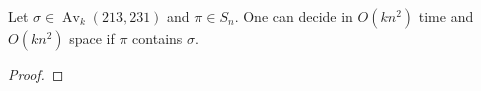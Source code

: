 \documentclass[a4paper]{llncs}
\DeclareMathOperator{\AV}{Av}
\newcommand{\ptext}{\pi}
\newcommand{\pmotif}{\sigma}
\DeclareMathOperator{\factora}{factor}
\newcommand{\factor}[2]{\factora_{{#1}}({#2})}
\DeclareMathOperator{\firsta}{first}
\newcommand{\first}[2]{\firsta(\factor{#1}{#2})}
\begin{document}
\begin{proposition}
	\label{Proposition:sigma avoids 213 and 231}
	Let $\sigma \in \AV_k(213,231)$ and $\pi \in S_n$.
	One can decide in $O(kn^2)$ time
	and $O(kn^2)$ space if $\pi$ contains $\sigma$.
\end{proposition}


\begin{proof}%
%
%


\end{proof}
\end{document}
